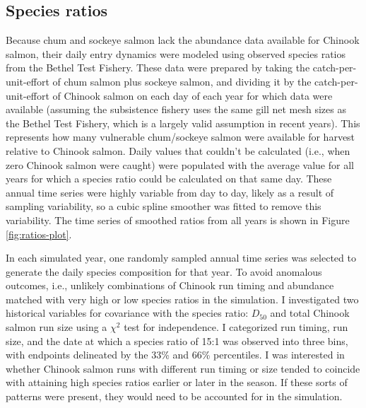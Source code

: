 \documentclass[12pt,]{book}
\theoremstyle{definition}
\theoremstyle{definition}
\theoremstyle{definition}
\theoremstyle{remark}
\begin{document}
\subsection{Species ratios}\label{mse-data-ratios}

\noindent
Because chum and sockeye salmon lack the abundance data available for
Chinook salmon, their daily entry dynamics were modeled using observed
species ratios from the Bethel Test Fishery. These data were prepared by
taking the catch-per-unit-effort of chum salmon plus sockeye salmon, and
dividing it by the catch-per-unit-effort of Chinook salmon on each day
of each year for which data were available (assuming the subsistence
fishery uses the same gill net mesh sizes as the Bethel Test Fishery,
which is a largely valid assumption in recent years). This represents
how many vulnerable chum/sockeye salmon were available for harvest
relative to Chinook salmon. Daily values that couldn't be calculated
(i.e., when zero Chinook salmon were caught) were populated with the
average value for all years for which a species ratio could be
calculated on that same day. These annual time series were highly
variable from day to day, likely as a result of sampling variability, so
a cubic spline smoother was fitted to remove this variability. The time
series of smoothed ratios from all years is shown in Figure
\ref{fig:ratios-plot}.

In each simulated year, one randomly sampled annual time series was
selected to generate the daily species composition for that year. To
avoid anomalous outcomes, i.e., unlikely combinations of Chinook run
timing and abundance matched with very high or low species ratios in the
simulation. I investigated two historical variables for covariance with
the species ratio: \(D_{50}\) and total Chinook salmon run size using a
\(\chi^2\) test for independence. I categorized run timing, run size,
and the date at which a species ratio of 15:1 was observed into three
bins, with endpoints delineated by the 33\% and 66\% percentiles. I was
interested in whether Chinook salmon runs with different run timing or
size tended to coincide with attaining high species ratios earlier or
later in the season. If these sorts of patterns were present, they would
need to be accounted for in the simulation.
\end{document}
